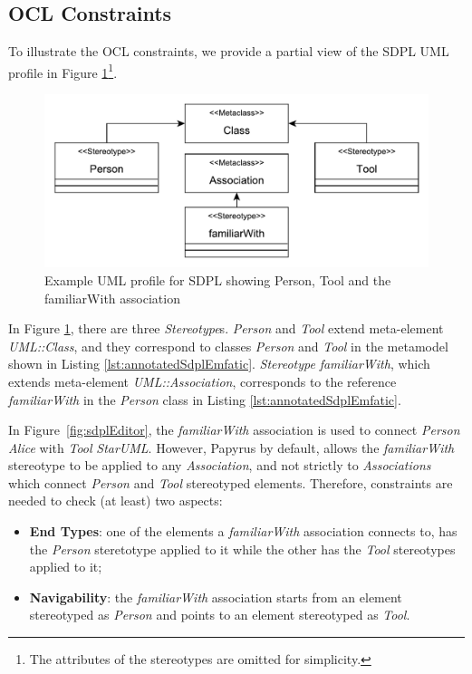 \subsection{OCL Constraints}
\label{sec:constraints}

To illustrate the OCL constraints, we provide a partial view of the SDPL UML profile in Figure \ref{fig:sample_profile}\footnote{The attributes of the stereotypes are omitted for simplicity.}.

\begin{figure}[ht!]
	\centering
	\includegraphics[width=1\textwidth]{diagrams/example_profile}
	\caption[]{Example UML profile for SDPL showing Person, Tool and the familiarWith association}
	\label{fig:sample_profile}
\end{figure}

In Figure \ref{fig:sample_profile}, there are three \emph{Stereotype}s. \emph{Person} and \emph{Tool} extend meta-element \emph{UML::Class}, and they correspond to classes \emph{Person} and \emph{Tool} in the metamodel shown in Listing \ref{lst:annotatedSdplEmfatic}. 
\emph{Stereotype} \emph{familiarWith}, which extends meta-element \emph{UML::Association}, corresponds to the reference \emph{familiarWith} in the \emph{Person} class in Listing \ref{lst:annotatedSdplEmfatic}.

In Figure~\ref{fig:sdplEditor}, the \textit{familiarWith} association is used to connect \textit{Person} \emph{Alice} with \textit{Tool} \emph{StarUML}. 
However, Papyrus by default, allows the \emph{familiarWith} stereotype to be applied to any \emph{Association}, and not strictly to \emph{Associations} which connect \emph{Person} and \emph{Tool} stereotyped elements. 
Therefore, constraints are needed to check (at least) two aspects:

\begin{itemize}
	\item \textbf{End Types}: one of the elements a \emph{familiarWith} association connects to, has the \emph{Person} steretotype applied to it while the other has the \emph{Tool} stereotypes applied to it;
	\item \textbf{Navigability}: the \emph{familiarWith} association starts from an element stereotyped as \emph{Person} and points to an element stereotyped as \emph{Tool}.
\end{itemize}


